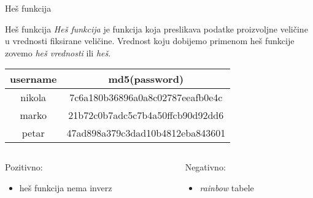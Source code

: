 \documentclass[aspectratio=169,xcolor=dvipsnames]{beamer}
\begin{document}
\begin{frame}{Heš funkcija}

    \begin{block}{Heš funkcija}
        \textit{Heš funkcija} je funkcija koja preslikava podatke proizvoljne
        veličine u vrednosti fiksirane veličine. Vrednost koju dobijemo
        primenom heš funkcije zovemo \textit{heš vrednosti} ili \textit{heš}.
    \end{block}

    \vspace{1em}

    \begin{center}
        \begin{tabular}{c|c}
            username & md5(password) \\
            \hline
            nikola & 7c6a180b36896a0a8c02787eeafb0e4c \\
            marko & 21b72c0b7adc5c7b4a50ffcb90d92dd6  \\
            petar & 47ad898a379c3dad10b4812eba843601
        \end{tabular}

    \end{center}

    \vspace{1em}

    \begin{columns}
        \begin{column}{0.4\textwidth}
            \pause
            Pozitivno:
            \pause
            \begin{itemize}
                \item heš funkcija nema inverz
            \end{itemize}
        \end{column}
        \begin{column}{0.4\textwidth}
            \pause
            Negativno:
            \pause
            \begin{itemize}
                \item \emph{rainbow} tabele
            \end{itemize}
        \end{column}
    \end{columns}

\end{frame}

\end{document}
